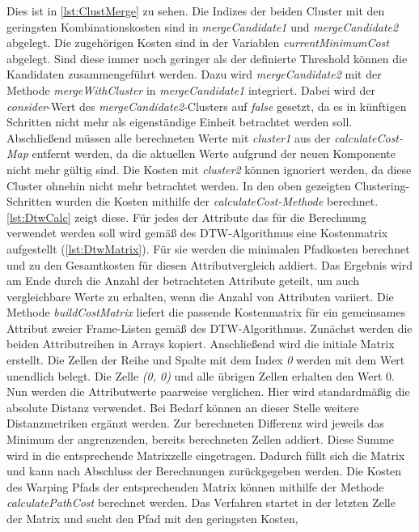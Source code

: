 Dies ist in \autoref{lst:ClustMerge} zu sehen.
Die Indizes der beiden Cluster mit den geringsten Kombinationskosten sind
in \emph{mergeCandidate1} und \emph{mergeCandidate2} abgelegt.
Die zugehörigen Kosten sind in der Variablen \emph{currentMinimumCost} abgelegt.
Sind diese immer noch geringer als der definierte Threshold können die Kandidaten zusammengeführt werden.
Dazu wird \emph{mergeCandidate2} mit der Methode \emph{mergeWithCluster} in \emph{mergeCandidate1} integriert.
Dabei wird der \emph{consider}-Wert des \emph{mergeCandidate2}-Clusters auf \emph{false} gesetzt,
da es in künftigen Schritten nicht mehr als eigenständige Einheit betrachtet werden soll.
Abschließend müssen alle berechneten Werte mit \emph{cluster1} aus der \emph{calculateCost-Map} entfernt werden,
da die aktuellen Werte aufgrund der neuen Komponente nicht mehr gültig sind.
Die Kosten mit \emph{cluster2} können ignoriert werden, da diese Cluster ohnehin nicht mehr betrachtet werden.
In den oben gezeigten Clustering-Schritten wurden die Kosten mithilfe der \emph{calculateCost-Methode} berechnet.
\autoref{lst:DtwCalc} zeigt diese.
Für jedes der Attribute das für die Berechnung verwendet werden soll wird gemäß des \ac{DTW}-Algorithmus
eine Kostenmatrix aufgestellt (\autoref{lst:DtwMatrix}).
Für sie werden die minimalen Pfadkosten berechnet und zu den Gesamtkosten für diesen Attributvergleich addiert.
Das Ergebnis wird am Ende durch die Anzahl der betrachteten Attribute geteilt,
um auch vergleichbare Werte zu erhalten, wenn die Anzahl von Attributen variiert.
Die Methode \emph{buildCostMatrix} liefert die passende Kostenmatrix für ein gemeinsames Attribut
zweier Frame-Listen gemäß des \ac{DTW}-Algorithmus.
Zunächst werden die beiden Attributreihen in Arrays kopiert.
Anschließend wird die initiale Matrix erstellt.
Die Zellen der Reihe und Spalte mit dem Index \emph{0} werden mit dem Wert {\glqq unendlich\grqq} belegt.
Die Zelle \emph{(0, 0)} und alle übrigen Zellen erhalten den Wert 0.
Nun werden die Attributwerte paarweise verglichen.
Hier wird standardmäßig die absolute Distanz verwendet.
Bei Bedarf können an dieser Stelle weitere Distanzmetriken ergänzt werden.
Zur berechneten Differenz wird jeweils das Minimum der angrenzenden, bereits berechneten Zellen addiert.
Diese Summe wird in die entsprechende Matrixzelle eingetragen.
Dadurch füllt sich die Matrix und kann nach Abschluss der Berechnungen zurückgegeben werden.
Die Kosten des Warping Pfads der entsprechenden Matrix können mithilfe der Methode \emph{calculatePathCost}
berechnet werden.
Das Verfahren startet in der letzten Zelle der Matrix und sucht den Pfad mit den geringsten Kosten,
